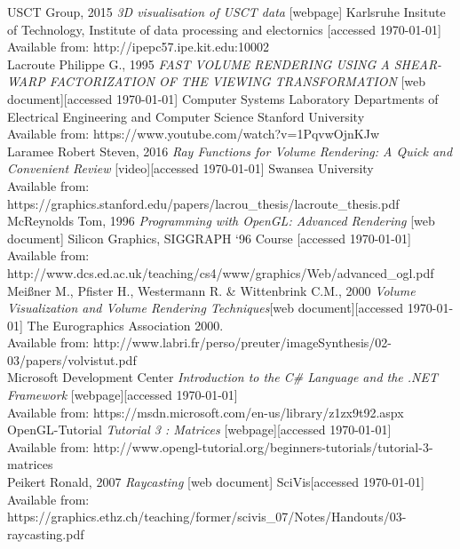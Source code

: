 \documentclass[twoside, english, 11pt]{report}
\begin{document}
\small USCT Group, 2015 \textit{3D visualisation of USCT data} [webpage] Karlsruhe Insitute of Technology, Institute of data processing and electornics [accessed \today] \\
Available from: http://ipepc57.ipe.kit.edu:10002\\

\small Lacroute Philippe G., 1995 \textit{FAST VOLUME RENDERING USING A SHEAR-WARP FACTORIZATION OF THE VIEWING TRANSFORMATION} [web document][accessed \today] Computer Systems Laboratory
Departments of Electrical Engineering and Computer Science Stanford University \\
Available from: https://www.youtube.com/watch?v=1PqvwOjnKJw\\

\small Laramee Robert Steven, 2016 \textit{Ray Functions for Volume Rendering: A Quick and Convenient Review} [video][accessed \today] Swansea University \\
Available from: https://graphics.stanford.edu/papers/lacrou\_thesis/lacroute\_thesis.pdf\\

\small McReynolds Tom, 1996 \textit{Programming with OpenGL: Advanced Rendering} [web document] Silicon Graphics, SIGGRAPH ‘96 Course [accessed \today] \\
Available from: http://www.dcs.ed.ac.uk/teaching/cs4/www/graphics/Web/advanced\_ogl.pdf\\

\small Meißner M., Pfister H., Westermann R. \& Wittenbrink C.M., 2000 \textit{Volume Visualization and Volume Rendering Techniques}[web document][accessed \today] The Eurographics Association 2000.\\
Available from: http://www.labri.fr/perso/preuter/imageSynthesis/02-03/papers/volvistut.pdf\\

\small Microsoft Development Center \textit{Introduction to the C\# Language and the .NET Framework} [webpage][accessed \today] \\
Available from: https://msdn.microsoft.com/en-us/library/z1zx9t92.aspx\\

\small OpenGL-Tutorial \textit{Tutorial 3 : Matrices} [webpage][accessed \today] \\
Available from: http://www.opengl-tutorial.org/beginners-tutorials/tutorial-3-matrices\\

\small Peikert Ronald, 2007 \textit{Raycasting} [web document] SciVis[accessed \today] \\
Available from: https://graphics.ethz.ch/teaching/former/scivis\_07/Notes/Handouts/03-raycasting.pdf\\
\end{document}
